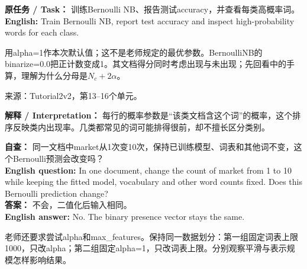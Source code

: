 \textbf{原任务 / Task：} 训练Bernoulli NB、报告测试accuracy，并查看每类高概率词。\\

\textbf{English:} Train Bernoulli NB, report test accuracy and inspect high-probability words for each class.


用alpha=1作本次默认值；这不是老师规定的最优参数。BernoulliNB的binarize=0.0把正计数变成1。其文档得分同时考虑出现与未出现；先回看中的手算，理解为什么分母是\(N_c+2\alpha\)。


来源：Tutorial2v2，第13–16个单元。








\textbf{解释 / Interpretation：} 每行的概率参数是“该类文档含这个词”的概率，这个排序反映类内出现率。几类都常见的词可能排得很前，却不擅长区分类别。


\textbf{自查：} 同一文档中market从1次变10次，保持已训练模型、词表和其他词不变，这个Bernoulli预测会改变吗？\\

\textbf{English question:} In one document, change the count of market from 1 to 10 while keeping the fitted model, vocabulary and other word counts fixed. Does this Bernoulli prediction change?\\

\textbf{答案：} 不会，二值化后输入相同。\\

\textbf{English answer:} No. The binary presence vector stays the same.










老师还要求尝试alpha和max\_features。保持同一数据划分：第一组固定词表上限1000，只改alpha；第二组固定alpha=1，只改词表上限。分别观察平滑与表示规模怎样影响结果。


